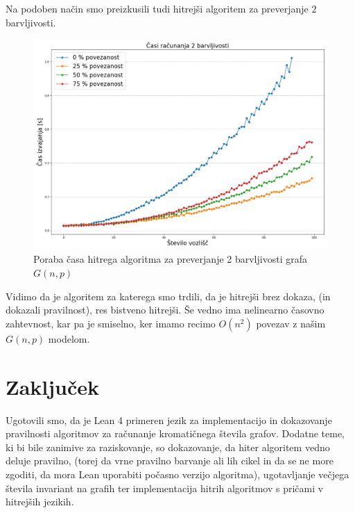 \documentclass[mat1]{fmfdelo}
\begin{document}
Na podoben način smo preizkusili tudi hitrejši algoritem za preverjanje $2$ barvljivosti.
\begin{figure}[H]
\begin{center}
\includegraphics[scale=0.4]{assets/2barvFast}
\caption{Poraba časa hitrega algoritma za preverjanje 2 barvljivosti grafa $G(n, p)$}
\label{slika2}
\end{center}
\end{figure}

Vidimo da je algoritem za katerega smo trdili, da je hitrejši brez dokaza, (in dokazali pravilnost), res bistveno hitrejši.
Še vedno ima nelinearno časovno zahtevnost, kar pa je smiselno, ker imamo recimo $O(n^2)$ povezav z našim $G(n, p)$ modelom.

\section{Zaključek}
Ugotovili smo, da je Lean 4 primeren jezik za implementacijo in dokazovanje pravilnosti algoritmov za računanje kromatičnega
števila grafov. Dodatne teme, ki bi bile zanimive za raziskovanje, so dokazovanje, da hiter algoritem vedno deluje pravilno,
(torej da vrne pravilno barvanje ali lih cikel in da se ne more zgoditi, da mora Lean uporabiti počasno verzijo algoritma),
ugotavljanje večjega števila invariant na grafih ter implementacija hitrih algoritmov s pričami v hitrejših jezikih.
\end{document}
